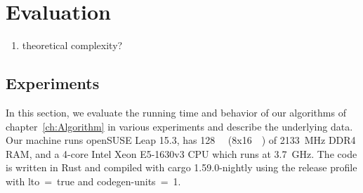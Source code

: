 
\chapter{Evaluation}
\label{ch:Evaluation}
\begin{enumerate}
	\item theoretical complexity?
\end{enumerate}

\section{Experiments}
In this section, we evaluate the running time and behavior of our algorithms of chapter~\ref{ch:Algorithm} in various experiments and describe the underlying data. Our machine runs openSUSE Leap 15.3, has \SI{128}{\giga\byte} (8x\SI{16}{\giga\byte}) of \SI{2133}{\mega\hertz} DDR4 RAM, and a 4-core Intel Xeon E5-1630v3 CPU which runs at \SI{3.7}{\giga\hertz}. The code is written in Rust and compiled with cargo 1.59.0-nightly using the release profile with lto~=~true and codegen-units~=~1.